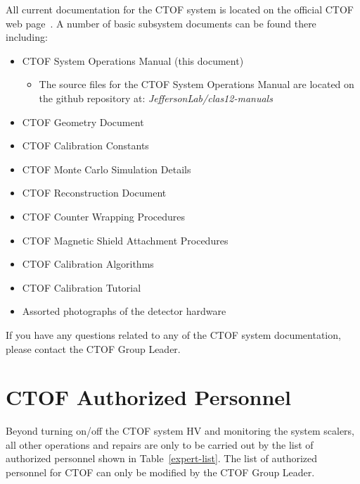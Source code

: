 \documentclass[12pt]{article}
\begin{document}
All current documentation for the CTOF system is located on the official CTOF web 
page~\cite{ctof-web}. A number of basic subsystem documents can be found there 
including:

\begin{itemize}
\item CTOF System Operations Manual (this document)
 \begin{itemize}
   \item The source files for the CTOF System Operations Manual are located on the
         github repository at: {\it JeffersonLab/clas12-manuals}
 \end{itemize}
\item CTOF Geometry Document
\item CTOF Calibration Constants
\item CTOF Monte Carlo Simulation Details
\item CTOF Reconstruction Document
\item CTOF Counter Wrapping Procedures
\item CTOF Magnetic Shield Attachment Procedures
\item CTOF Calibration Algorithms
\item CTOF Calibration Tutorial
\item Assorted photographs of the detector hardware
\end{itemize}

If you have any questions related to any of the CTOF system documentation, please 
contact the CTOF Group Leader.

\section{CTOF Authorized Personnel}
\label{personnel}

Beyond turning on/off the CTOF system HV and monitoring the system scalers, all other 
operations and repairs are only to be carried out by the list of authorized personnel 
shown in Table~\ref{expert-list}. The list of authorized personnel for CTOF can only 
be modified by the CTOF Group Leader.
\end{document}
